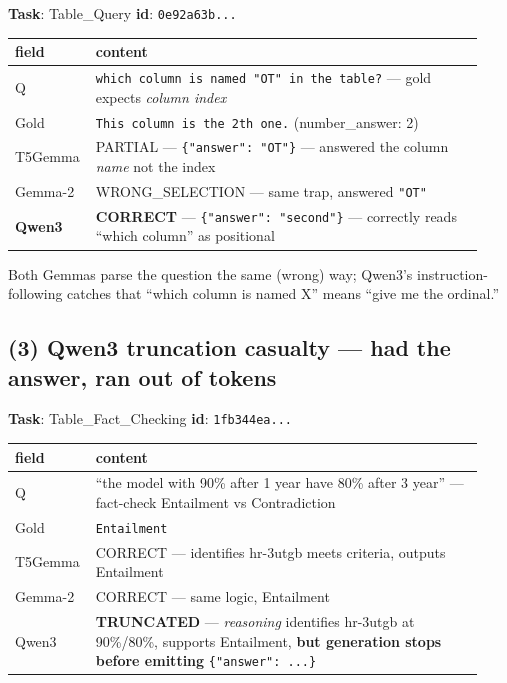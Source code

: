 \documentclass[11pt]{article}
\begin{document}
\textbf{Task}: Table\_Query \quad \textbf{id}: \texttt{0e92a63b...}

\begin{center}\small
\begin{tabular}{p{0.13\linewidth}p{0.80\linewidth}}
\toprule
\textbf{field} & \textbf{content} \\
\midrule
Q    & \texttt{which column is named "OT" in the table?} --- gold expects \emph{column index} \\
Gold & \texttt{This column is the 2th one.} (number\_answer: 2) \\
T5Gemma & PARTIAL --- \texttt{\{"answer": "OT"\}} --- answered the column \emph{name} not the index \\
Gemma-2 & WRONG\_SELECTION --- same trap, answered \texttt{"OT"} \\
\rowcolor{hilite}
\textbf{Qwen3} & \textbf{CORRECT} --- \texttt{\{"answer": "second"\}} --- correctly reads ``which column'' as positional \\
\bottomrule
\end{tabular}
\end{center}

Both Gemmas parse the question the same (wrong) way; Qwen3's
instruction-following catches that ``which column is named X'' means
``give me the ordinal.''

\subsection*{(3) Qwen3 truncation casualty --- had the answer, ran out of tokens}

\textbf{Task}: Table\_Fact\_Checking \quad \textbf{id}: \texttt{1fb344ea...}

\begin{center}\small
\begin{tabular}{p{0.13\linewidth}p{0.80\linewidth}}
\toprule
\textbf{field} & \textbf{content} \\
\midrule
Q    & ``the model with 90\% after 1 year have 80\% after 3 year'' --- fact-check Entailment vs Contradiction \\
Gold & \texttt{Entailment} \\
T5Gemma & CORRECT --- identifies hr-3utgb meets criteria, outputs Entailment \\
Gemma-2 & CORRECT --- same logic, Entailment \\
\rowcolor{hilite}
Qwen3 & \textbf{TRUNCATED} --- \emph{reasoning} identifies hr-3utgb at 90\%/80\%, supports Entailment, \textbf{but generation stops before emitting} \texttt{\{"answer": ...\}} \\
\bottomrule
\end{tabular}
\end{center}
\end{document}

